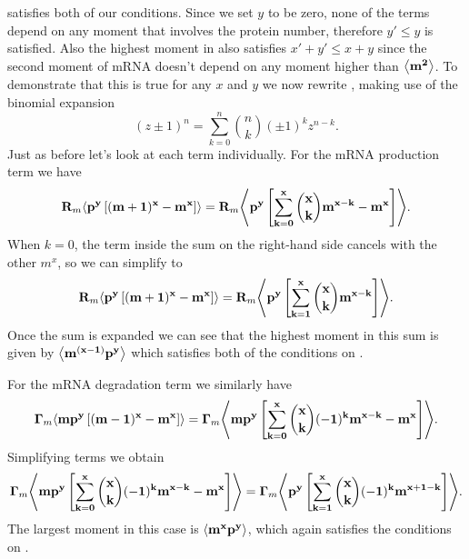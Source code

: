  satisfies both of our conditions. Since we set $y$ to
be zero, none of the terms depend on any moment that involves the protein number,
therefore $y' \leq y$ is satisfied. Also the highest moment in
 also satisfies $x' + y' \leq x + y$ since the second
moment of mRNA doesn't depend on any moment higher than $\mathbf{\left\langle m^2 \right\rangle}$. To
demonstrate that this is true for any $x$ and $y$ we now rewrite
, making use of the binomial expansion
\begin{equation}
  (z \pm 1)^n = \sum_{k=0}^n {n \choose k} (\pm 1)^{k} z^{n-k}.
\end{equation}
Just as before let's look at each term individually. For the mRNA production
term we have
\begin{equation}
  \mathbf{R}_m \mathbf{\left\langle p^y \left[ (m + 1)^x -m^x \right] \right\rangle} =
  \mathbf{R}_m \mathbf{\left\langle p^y \left[ \sum_{k=0}^x {x \choose k} m^{x-k} - m^x \right] \right\rangle}.
\end{equation}
When $k = 0$, the term inside the sum on the right-hand side cancels with the
other $m^x$, so we can simplify to
\begin{equation}
  \mathbf{R}_m \mathbf{\left\langle p^y \left[ (m + 1)^x -m^x \right] \right\rangle} =
  \mathbf{R}_m \mathbf{\left\langle p^y \left[ \sum_{k=1}^x {x \choose k} m^{x-k} \right] \right\rangle}.
\end{equation}
Once the sum is expanded we can see that the highest moment in this sum is given
by $\mathbf{\left\langle m^{(x-1)} p^y \right\rangle}$ which satisfies both of the conditions on
.

For the mRNA degradation term we similarly have
\begin{equation}
  \mathbf{\Gamma}_m \mathbf{\left\langle m p^y \left[ (m - 1)^x - m^x \right] \right\rangle} =
  \mathbf{\Gamma}_m \mathbf{\left\langle m p^y \left[ \sum_{k=0}^x {x \choose k}(-1)^k m^{x-k} -
                          m^x \right] \right\rangle}.
\end{equation}
Simplifying terms we obtain
\begin{equation}
  \mathbf{\Gamma}_m \mathbf{\left\langle m p^y \left[ \sum_{k=0}^x {x \choose k}(-1)^k m^{x-k} -
                          m^x \right] \right\rangle} =
  \mathbf{\Gamma}_m \mathbf{\left\langle p^y \left[ \sum_{k=1}^x {x \choose k}(-1)^k m^{x+1-k} \right] \right\rangle}.
\end{equation}
The largest moment in this case is $\mathbf{\left\langle m^x p^y  \right\rangle}$, which again satisfies
the conditions on .

